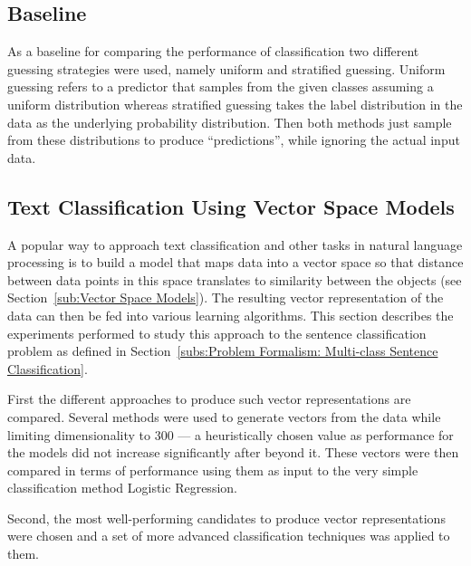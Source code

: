 \subsection{Baseline}
\label{sub:Baseline (Experiments)}

As a baseline for comparing the performance of classification two different guessing strategies were used, namely uniform and stratified guessing.
Uniform guessing refers to a predictor that samples from the given classes assuming a uniform distribution whereas stratified guessing takes the label distribution in the data as the underlying probability distribution.
Then both methods just sample from these distributions to produce ``predictions'', while ignoring the actual input data.


\subsection{Text Classification Using Vector Space Models}
\label{sub:Text Classification Using Vector Space Models}

A popular way to approach text classification and other tasks in natural language processing is to build a model that maps data into a vector space so that distance between data points in this space translates to similarity between the objects (see Section~\ref{sub:Vector Space Models}). The resulting vector representation of the data can then be fed into various learning algorithms. This section describes the experiments performed to study this approach to the sentence classification problem as defined in Section~\ref{subs:Problem Formalism: Multi-class Sentence Classification}.

First the different approaches to produce such vector representations are compared. Several methods were used to generate vectors from the data while limiting dimensionality to 300 --- a heuristically chosen value as performance for the models did not increase significantly after beyond it. These vectors were then compared in terms of performance using them as input to the very simple classification method Logistic Regression.

Second, the most well-performing candidates to produce vector representations were chosen and a set of more advanced classification techniques was applied to them.


